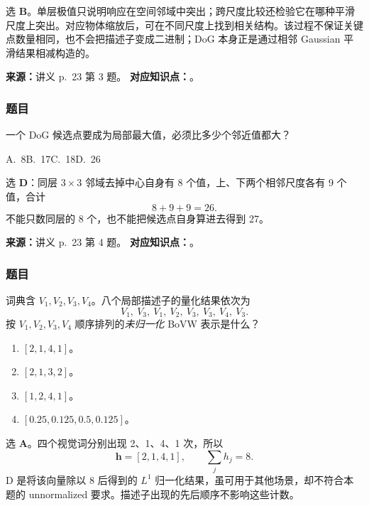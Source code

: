 \begin{checkedsolution}
选 \textbf{B}。单层极值只说明响应在空间邻域中突出；跨尺度比较还检验它在哪种平滑尺度上突出。对应物体缩放后，可在不同尺度上找到相关结构。该过程不保证关键点数量相同，也不会把描述子变成二进制；DoG 本身正是通过相邻 Gaussian 平滑结果相减构造的。
\end{checkedsolution}

\nopagebreak[4]

\textbf{来源：}讲义 p.~23 第 3 题。
\textbf{对应知识点：}。

\subsubsection*{题目}

一个 DoG 候选点要成为局部最大值，必须比多少个邻近值都大？
\begin{center}
  A.~8\qquad B.~17\qquad C.~18\qquad D.~26
\end{center}

\begin{checkedsolution}
选 \textbf{D}：同层 $3\times3$ 邻域去掉中心自身有 8 个值，上、下两个相邻尺度各有 9 个值，合计
\[
  8+9+9=\boxed{26}.
\]
不能只数同层的 8 个，也不能把候选点自身算进去得到 27。
\end{checkedsolution}

\nopagebreak[4]

\textbf{来源：}讲义 p.~23 第 4 题。
\textbf{对应知识点：}。

\subsubsection*{题目}

词典含 $V_1,V_2,V_3,V_4$。八个局部描述子的量化结果依次为
\[
  V_1,\ V_3,\ V_1,\ V_2,\ V_3,\ V_3,\ V_4,\ V_3.
\]
按 $V_1,V_2,V_3,V_4$ 顺序排列的\emph{未归一化} BoVW 表示是什么？
\begin{enumerate}[label=\Alph*.,nosep]
  \item $[2,1,4,1]$。
  \item $[2,1,3,2]$。
  \item $[1,2,4,1]$。
  \item $[0.25,0.125,0.5,0.125]$。
\end{enumerate}

\begin{checkedsolution}
选 \textbf{A}。四个视觉词分别出现 2、1、4、1 次，所以
\[
  \boxed{\bm h=[2,1,4,1]},\qquad \sum_j h_j=8.
\]
D 是将该向量除以 8 后得到的 $L^1$ 归一化结果，虽可用于其他场景，却不符合本题的 unnormalized 要求。描述子出现的先后顺序不影响这些计数。
\end{checkedsolution}
